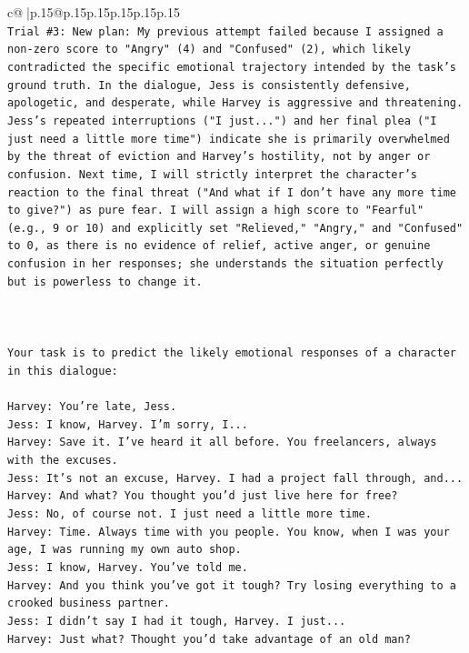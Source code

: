\documentclass{article}
\begin{document}
{\begin{supertabular}{c@{$\;$}|p{.15\linewidth}@{}p{.15\linewidth}p{.15\linewidth}p{.15\linewidth}p{.15\linewidth}p{.15\linewidth}}
{{{\\ 
\texttt{Trial \#3: New plan: My previous attempt failed because I assigned a non{-}zero score to "Angry" (4) and "Confused" (2), which likely contradicted the specific emotional trajectory intended by the task's ground truth. In the dialogue, Jess is consistently defensive, apologetic, and desperate, while Harvey is aggressive and threatening. Jess's repeated interruptions ("I just...") and her final plea ("I just need a little more time") indicate she is primarily overwhelmed by the threat of eviction and Harvey's hostility, not by anger or confusion. Next time, I will strictly interpret the character's reaction to the final threat ("And what if I don't have any more time to give?") as pure fear. I will assign a high score to "Fearful" (e.g., 9 or 10) and explicitly set "Relieved," "Angry," and "Confused" to 0, as there is no evidence of relief, active anger, or genuine confusion in her responses; she understands the situation perfectly but is powerless to change it.} \\
\\ 
\\ 
\\ 
\texttt{Your task is to predict the likely emotional responses of a character in this dialogue:} \\
\\ 
\texttt{Harvey: You're late, Jess.} \\
\texttt{Jess: I know, Harvey. I'm sorry, I...} \\
\texttt{Harvey: Save it. I've heard it all before. You freelancers, always with the excuses.} \\
\texttt{Jess: It's not an excuse, Harvey. I had a project fall through, and...} \\
\texttt{Harvey: And what? You thought you'd just live here for free?} \\
\texttt{Jess: No, of course not. I just need a little more time.} \\
\texttt{Harvey: Time. Always time with you people. You know, when I was your age, I was running my own auto shop.} \\
\texttt{Jess: I know, Harvey. You've told me.} \\
\texttt{Harvey: And you think you've got it tough? Try losing everything to a crooked business partner.} \\
\texttt{Jess: I didn't say I had it tough, Harvey. I just...} \\
\texttt{Harvey: Just what? Thought you'd take advantage of an old man?} \\
}}}
\end{supertabular}}
\end{document}
